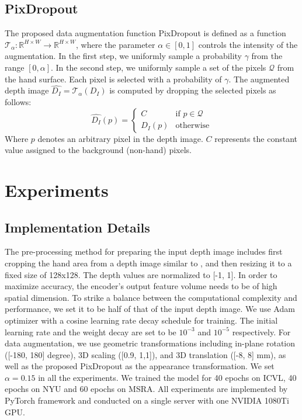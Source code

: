 \documentclass{article}
\begin{document}
\subsection{PixDropout}
The proposed data augmentation function PixDropout is defined as a function $\mathcal{T}_{\alpha}: {\mathbb{R}^{H\times{W}}}\rightarrow {\mathbb{R}^{H\times{W}}}$, where the parameter $\alpha\in{[0,1]}$ controls the intensity of the augmentation. In the first step, we uniformly sample a probability $\gamma$ from the range $[0,\alpha]$. In the second step, we uniformly sample a set of the pixels $\mathcal{Q}$ from the hand surface. Each pixel is selected with a probability of $\gamma$. The augmented depth image $\hat{D_I} = \mathcal{T}_{\alpha}(D_I)$ is computed by dropping the selected pixels as follows: 
\begin{equation}
  \hat{D_I}(p)=
 \begin{cases}
    C & \text{if }  p\in{\mathcal{Q}}\\
    D_I(p)               & \text{otherwise}
\end{cases}
\end{equation}
Where $p$ denotes an arbitrary pixel in the depth image. $C$  represents the constant value assigned to the background (non-hand) pixels. 

\section{Experiments}
\subsection{Implementation Details}
The pre-processing method for preparing the input depth image includes first cropping the hand area from a depth image similar to \cite{oberweger2017deepprior++}, and then resizing it to a fixed size of 128x128. The depth values are normalized to [-1, 1]. In order to maximize accuracy, the encoder's output feature volume needs to be of high spatial dimension. To strike a balance between the computational complexity and performance, we set it to be half of that of the input depth image. We use Adam \cite{kingma2014adam} optimizer with a cosine learning rate decay schedule \cite{loshchilov2016sgdr} for training. The initial learning rate and the weight decay are set to be $10^{-3}$ and $10^{-5}$ respectively.  For data augmentation, we use geometric transformations including in-plane rotation ([-180, 180] degree), 3D scaling ([0.9, 1,1]), and 3D translation ([-8, 8] mm), as well as the proposed PixDropout as the appearance transformation. We set $\alpha = 0.15$ in all the experiments. We trained the model for 40 epochs on ICVL, 40 epochs on NYU and 60 epochs on MSRA. All experiments are implemented by PyTorch framework \cite{paszke2019pytorch} and conducted on a single server with one NVIDIA 1080Ti GPU.
\end{document}
